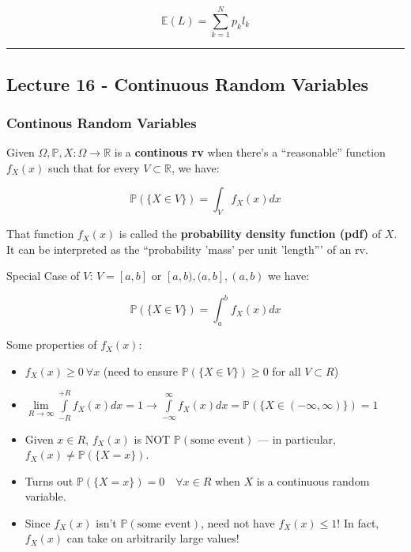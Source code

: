 \documentclass{article}
\begin{document}
\[
  \mathbb{E}(L) = \sum_{k=1}^Np_kl_k
\]


\medskip\hrule
\subsection{Lecture 16 - Continuous Random Variables}

\subsubsection{Continous Random Variables}

Given $\Omega, \mathbb{P}, X: \Omega \rightarrow \mathbb{R}$ is a
\textbf{continous rv} when there's a ``reasonable'' function $f_X(x)$
such that for every $V \subset \mathbb{R}$, we have:

\begin{equation}
  \tag{Continuous rv}
  \boxed{
    \mathbb{P}(\{X\in V\}) = \int_V f_X(x)dx
  }
\end{equation}

That function $f_X(x)$ is called the \textbf{probability density
  function (pdf)} of $X$. It can be interpreted as the ``probability
'mass' per unit 'length''' of an rv.

Special Case of $V$: $V = [a,b]$ or $[a,b), (a,b], (a,b)$ we have:

\[
  \mathbb{P}(\{X\in V\}) = \int_a^b f_X(x)dx
\]

Some properties of $f_X(x)$:

\begin{itemize}
\item $f_X(x) \geq 0 \ \forall x$ (need to ensure $\mathbb{P}(\{X \in
  V\}) \geq 0$ for all $V \subset R$)

\item $\lim\limits_{R\to\infty} \int\limits_{-R}^{+R} f_X(x) dx = 1
  \rightarrow \int\limits_{-\infty}^{\infty} f_X(x)dx =
  \mathbb{P}(\{X\in(-\infty,\infty)\}) = 1$

\item Given $x\in R$, $f_X(x)$ is NOT $\mathbb{P}(\text{some event})$
  --- in particular, $f_X(x) \not= \mathbb{P}(\{X=x\})$.

\item Turns out $\mathbb{P}(\{X=x\})=0 \quad \forall x\in R$ when $X$
  is a continuous random variable.

\item Since $f_X(x)$ isn't $\mathbb{P}(\text{some event})$, need not
  have $f_X(x) \leq 1$! In fact, $f_X(x)$ can take on arbitrarily
  large values!
\end{itemize}
\end{document}
